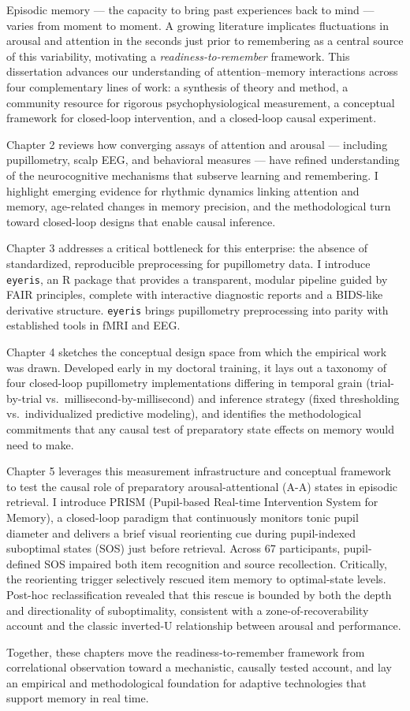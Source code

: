 
Episodic memory --- the capacity to bring past experiences back to mind --- varies from moment to moment. A growing literature implicates fluctuations in arousal and attention in the seconds just prior to remembering as a central source of this variability, motivating a \textit{readiness-to-remember} framework. This dissertation advances our understanding of attention--memory interactions across four complementary lines of work: a synthesis of theory and method, a community resource for rigorous psychophysiological measurement, a conceptual framework for closed-loop intervention, and a closed-loop causal experiment.

Chapter 2 reviews how converging assays of attention and arousal --- including pupillometry, scalp EEG, and behavioral measures --- have refined understanding of the neurocognitive mechanisms that subserve learning and remembering. I highlight emerging evidence for rhythmic dynamics linking attention and memory, age-related changes in memory precision, and the methodological turn toward closed-loop designs that enable causal inference.

Chapter 3 addresses a critical bottleneck for this enterprise: the absence of standardized, reproducible preprocessing for pupillometry data. I introduce \texttt{eyeris}, an R package that provides a transparent, modular pipeline guided by FAIR principles, complete with interactive diagnostic reports and a BIDS-like derivative structure. \texttt{eyeris} brings pupillometry preprocessing into parity with established tools in fMRI and EEG.

Chapter 4 sketches the conceptual design space from which the empirical work was drawn. Developed early in my doctoral training, it lays out a taxonomy of four closed-loop pupillometry implementations differing in temporal grain (trial-by-trial vs.\ millisecond-by-millisecond) and inference strategy (fixed thresholding vs.\ individualized predictive modeling), and identifies the methodological commitments that any causal test of preparatory state effects on memory would need to make.

Chapter 5 leverages this measurement infrastructure and conceptual framework to test the causal role of preparatory arousal-attentional (A-A) states in episodic retrieval. I introduce PRISM (Pupil-based Real-time Intervention System for Memory), a closed-loop paradigm that continuously monitors tonic pupil diameter and delivers a brief visual reorienting cue during pupil-indexed suboptimal states (SOS) just before retrieval. Across 67 participants, pupil-defined SOS impaired both item recognition and source recollection. Critically, the reorienting trigger selectively rescued item memory to optimal-state levels. Post-hoc reclassification revealed that this rescue is bounded by both the depth and directionality of suboptimality, consistent with a zone-of-recoverability account and the classic inverted-U relationship between arousal and performance.

Together, these chapters move the readiness-to-remember framework from correlational observation toward a mechanistic, causally tested account, and lay an empirical and methodological foundation for adaptive technologies that support memory in real time.
